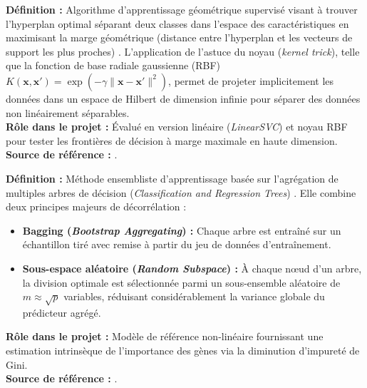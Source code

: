 \documentclass[11pt,a4paper]{article}
\begin{document}
\begin{defbox}
\textbf{Définition :} Algorithme d'apprentissage géométrique supervisé visant à trouver l'hyperplan optimal séparant deux classes dans l'espace des caractéristiques en maximisant la marge géométrique (distance entre l'hyperplan et les vecteurs de support les plus proches) \citep{cortes1995support}. L'application de l'astuce du noyau (\textit{kernel trick}), telle que la fonction de base radiale gaussienne (RBF) $K(\mathbf{x}, \mathbf{x}') = \exp(-\gamma \|\mathbf{x} - \mathbf{x}'\|^2)$, permet de projeter implicitement les données dans un espace de Hilbert de dimension infinie pour séparer des données non linéairement séparables.\\
\textbf{Rôle dans le projet :} Évalué en version linéaire (\textit{LinearSVC}) et noyau RBF pour tester les frontières de décision à marge maximale en haute dimension.\\
\textbf{Source de référence :} \citet{cortes1995support}.
\end{defbox}

\begin{defbox}
\textbf{Définition :} Méthode ensembliste d'apprentissage basée sur l'agrégation de multiples arbres de décision (\textit{Classification and Regression Trees}) \citep{breiman2001random}. Elle combine deux principes majeurs de décorrélation :
\begin{itemize}[leftmargin=*, label=$\bullet$]
    \item \textbf{Bagging (\textit{Bootstrap Aggregating}) :} Chaque arbre est entraîné sur un échantillon tiré avec remise à partir du jeu de données d'entraînement.
    \item \textbf{Sous-espace aléatoire (\textit{Random Subspace}) :} À chaque nœud d'un arbre, la division optimale est sélectionnée parmi un sous-ensemble aléatoire de $m \approx \sqrt{p}$ variables, réduisant considérablement la variance globale du prédicteur agrégé.
\end{itemize}
\textbf{Rôle dans le projet :} Modèle de référence non-linéaire fournissant une estimation intrinsèque de l'importance des gènes via la diminution d'impureté de Gini.\\
\textbf{Source de référence :} \citet{breiman2001random}.
\end{defbox}
\end{document}
